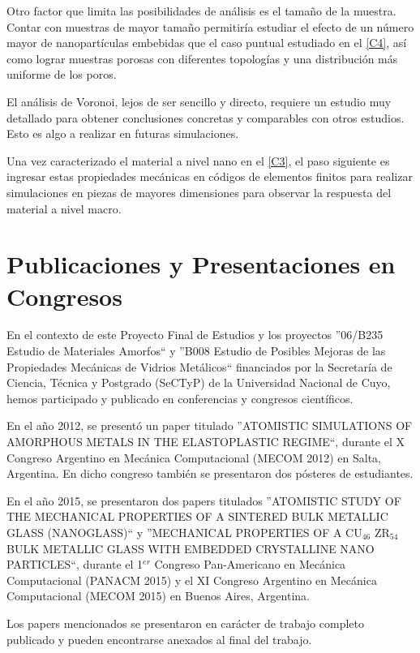 Otro factor que limita las posibilidades de análisis es el tamaño de la muestra. Contar con muestras de mayor tamaño permitiría estudiar el efecto de un  número mayor de nanopartículas embebidas que el caso puntual estudiado en el \cref{C4}, así como lograr muestras porosas con diferentes topologías y una distribución más uniforme de los poros.

El análisis de Voronoi, lejos de ser sencillo y directo, requiere un estudio muy detallado para obtener conclusiones concretas y comparables con otros estudios. Esto es algo a realizar en futuras simulaciones.

Una vez caracterizado el material a nivel nano en el \cref{C3}, el paso siguiente es ingresar estas propiedades mecánicas en códigos de elementos finitos para realizar simulaciones en piezas de mayores dimensiones para observar la respuesta del material a nivel macro.

\section{Publicaciones y Presentaciones en Congresos}

En el contexto de este Proyecto Final de Estudios y los proyectos ''06/B235 Estudio de Materiales Amorfos`` y ''B008 Estudio de Posibles Mejoras de las Propiedades Mecánicas de Vidrios Metálicos`` financiados por la Secretaría de Ciencia, Técnica y Postgrado (SeCTyP) de la Universidad Nacional de Cuyo, hemos participado y publicado en conferencias y congresos científicos.

En el año 2012, se presentó un paper titulado ''ATOMISTIC SIMULATIONS OF AMORPHOUS METALS IN THE ELASTOPLASTIC REGIME``, durante el X Congreso Argentino en Mecánica Computacional (MECOM 2012) en Salta, Argentina. En dicho congreso también se presentaron dos pósteres de estudiantes.

En el año 2015, se presentaron dos papers titulados ''ATOMISTIC STUDY OF THE MECHANICAL PROPERTIES OF A SINTERED BULK METALLIC GLASS (NANOGLASS)`` y ''MECHANICAL PROPERTIES OF A CU$_{46}$ ZR$_{54}$ BULK METALLIC GLASS WITH EMBEDDED CRYSTALLINE NANO PARTICLES``, durante el 1$^{er}$ Congreso Pan-Americano en Mecánica Computacional (PANACM 2015) y el XI Congreso Argentino en Mecánica Computacional (MECOM 2015) en Buenos Aires, Argentina.

Los papers mencionados se presentaron en carácter de trabajo completo publicado y pueden encontrarse anexados al final del trabajo.




